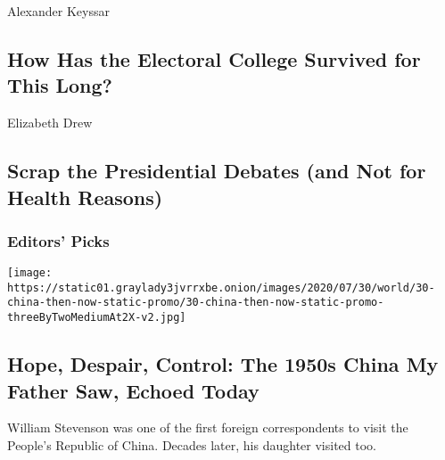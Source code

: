 \href{/2020/08/03/opinion/electoral-college-racism-white-supremacy.html}{}

Alexander Keyssar

\hypertarget{how-has-the-electoral-college-survived-for-this-long}{%
\subsection{How Has the Electoral College Survived for This
Long?}\label{how-has-the-electoral-college-survived-for-this-long}}

\href{/2020/08/03/opinion/trump-biden-presidential-debates-2020.html}{}

Elizabeth Drew

\hypertarget{scrap-the-presidential-debates-and-not-for-health-reasons}{%
\subsection{Scrap the Presidential Debates (and Not for Health
Reasons)}\label{scrap-the-presidential-debates-and-not-for-health-reasons}}

\hypertarget{editors-picks}{%
\subsubsection{Editors' Picks}\label{editors-picks}}

\href{/interactive/2020/07/30/world/asia/china-1950s-echoed-today.html}{}

\texttt{[image: https://static01.graylady3jvrrxbe.onion/images/2020/07/30/world/30-china-then-now-static-promo/30-china-then-now-static-promo-threeByTwoMediumAt2X-v2.jpg]}

\href{/interactive/2020/07/30/world/asia/china-1950s-echoed-today.html}{}

\hypertarget{hope-despair-control-the-1950s-china-my-father-saw-echoed-today}{%
\subsection{Hope, Despair, Control: The 1950s China My Father Saw,
Echoed
Today}\label{hope-despair-control-the-1950s-china-my-father-saw-echoed-today}}

William Stevenson was one of the first foreign correspondents to visit
the People's Republic of China. Decades later, his daughter visited too.

\href{/interactive/2020/08/03/magazine/padma-lakshmi-interview.html}{}

